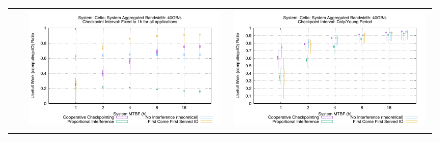 \documentclass[conference]{IEEEtran}
\begin{document}
\begin{figure}[t]
\begin{tabular}{C{.02\linewidth}C{.49\linewidth}C{.49\linewidth}}
 & \includegraphics[width=\linewidth]{sim/figures/40gbs-1hckpt-work-celio.pdf} & \includegraphics[width=\linewidth]{sim/figures/40gbs-dalyckpt-work-celio.pdf} \\

\end{tabular}
\end{figure}
\end{document}
